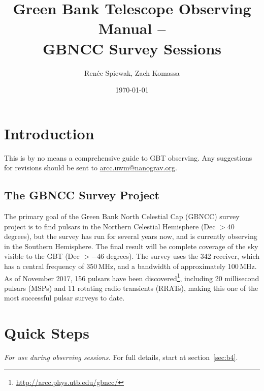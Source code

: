 \documentclass[11pt]{article}
\begin{document}
\title{Green Bank Telescope Observing Manual -- \\
 GBNCC Survey Sessions}
\author{Ren\'ee Spiewak, Zach Komassa}

\date{\today}                                           %

\maketitle 
{}
\tableofcontents



\section{Introduction} %
This is by no means a comprehensive guide to GBT observing.  Any suggestions for revisions should be sent to \href{mailto:arcc.uwm@nanograv.org}{arcc.uwm@nanograv.org}.  


\subsection{The GBNCC Survey Project} %
The primary goal of the Green Bank North Celestial Cap (GBNCC) survey project is to find pulsars in the Northern Celestial Hemisphere (Dec $>40$ degrees), but the survey has run for several years now, and is currently observing in the Southern Hemisphere.  The final result will be complete coverage of the sky visible to the GBT (Dec $>-46$ degrees).  The survey uses the 342 receiver, which has a central frequency of 350\,MHz, and a bandwidth of approximately 100\,MHz.  As of November 2017, 156 pulsars have been discovered\footnote{\url{http://arcc.phys.utb.edu/gbncc/}}, including 20 millisecond pulsars (MSPs) and 11 rotating radio transients (RRATs), making this one of the most successful pulsar surveys to date.  



\section{Quick Steps}\label{sec:quick}  %
\textit{For use during observing sessions.}  For full details, start at section~\ref{sec:b4}.  
\end{document}
